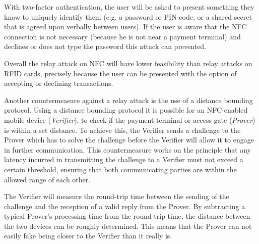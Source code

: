 With two-factor authentication, the user will be asked to present something they know to uniquely identify them (e.g. a password or PIN code, or a shared secret that is agreed upon verbally between users).
If the user is aware that the NFC connection is not necessary (because he is not near a payment terminal) and declines or does not type the password this attack can prevented.
\cite{1128470}

Overall the relay attack on NFC will have lower feasibility than relay attacks on RFID cards, precisely because the user can be presented with the option of accepting or declining transactions.

Another countermeasure against a relay attack is the use of a distance bounding protocol.
Using a distance bounding protocol it is possible for an NFC-enabled mobile device (\textit{Verifier}), to check if the payment terminal or access gate (\textit{Prover}) is within a set distance.
To achieve this, the Verifier sends a challenge to the Prover which has to solve the challenge before the Verifier will allow it to engage in further communication.
This countermeasure works on the principle that any latency incurred in transmitting the challenge to a Verifier must not exceed a certain threshold, ensuring that both communicating parties are within the allowed range of each other.

The Verifier will measure the round-trip time between the sending of the challenge and the reception of a valid reply from the Prover.
By subtracting a typical Prover's processing time from the round-trip time, the distance between the two devices can be roughly determined.
This means that the Prover can not easily fake being closer to the Verifier than it really is.



